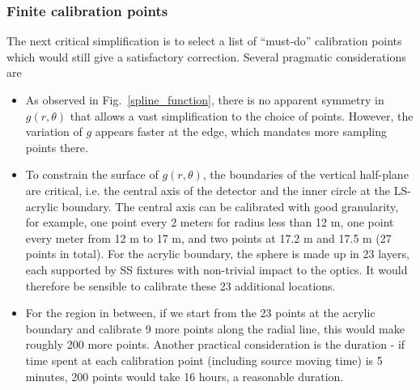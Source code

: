\documentclass[a4paper,10pt,twoside]{cpc-hepnp}
\begin{document}
\begin{CJK*}{GB}{gbsn}
\begin{multicols}{2}
\subsubsection{Finite calibration points}
\label{finite-calib-p}
The next critical simplification is to select a list of ``must-do''
calibration points which would still give a satisfactory
correction. Several pragmatic considerations are
\begin{itemize}
\item As observed in Fig.~\ref{spline_function}, there is no apparent
  symmetry in $g(r,\theta)$ that allows a vast simplification to the
  choice of points. However, the variation of $g$ appears faster at
  the edge, which mandates more sampling points there.


\item To constrain the surface of $g(r,\theta)$, the boundaries of the
  vertical half-plane are critical, i.e. the central axis of the
  detector and the inner circle at the LS-acrylic boundary.  The
  central axis can be calibrated with good granularity, for example,
  one point every 2 meters for radius less than 12 m, one point every
  meter from 12 m to 17 m, and two points at 17.2 m and 17.5 m (27
  points in total).  For the acrylic boundary, the sphere is made up
  in 23 layers, each supported by SS fixtures with non-trivial
  impact to the optics. It would therefore be sensible to calibrate
  these 23 additional locations.

\item For the region in between, if we start from the 23 points at the
  acrylic boundary and calibrate 9 more points along the radial line,
  this would make roughly 200 more points. Another practical
  consideration is the duration - if time spent at each calibration
  point (including source moving time) is 5 minutes, 200 points would
  take 16 hours, a reasonable duration.


\end{itemize}
\end{multicols}
\end{CJK*}
\end{document}

